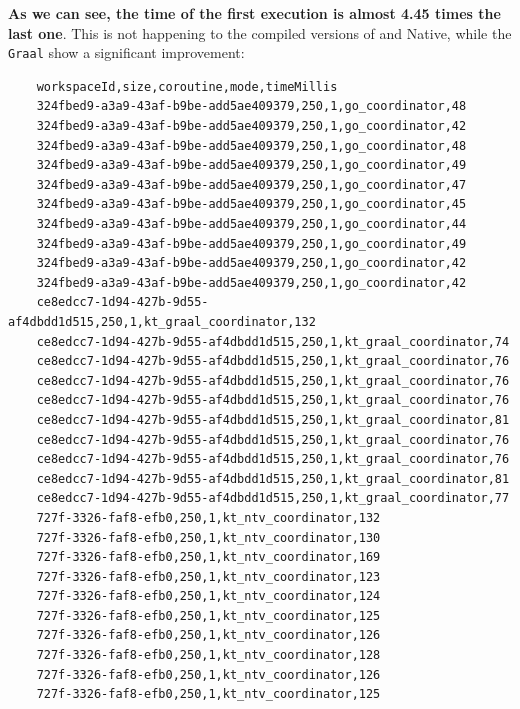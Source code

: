 \textbf{As we can see, the time of the first execution is almost 4.45 times the last one}. This is not happening to the compiled versions of \Go and \Kotlin Native, while the \texttt{Graal} show a significant improvement:

\begin{lstlisting}
	workspaceId,size,coroutine,mode,timeMillis
	324fbed9-a3a9-43af-b9be-add5ae409379,250,1,go_coordinator,48
	324fbed9-a3a9-43af-b9be-add5ae409379,250,1,go_coordinator,42
	324fbed9-a3a9-43af-b9be-add5ae409379,250,1,go_coordinator,48
	324fbed9-a3a9-43af-b9be-add5ae409379,250,1,go_coordinator,49
	324fbed9-a3a9-43af-b9be-add5ae409379,250,1,go_coordinator,47
	324fbed9-a3a9-43af-b9be-add5ae409379,250,1,go_coordinator,45
	324fbed9-a3a9-43af-b9be-add5ae409379,250,1,go_coordinator,44
	324fbed9-a3a9-43af-b9be-add5ae409379,250,1,go_coordinator,49
	324fbed9-a3a9-43af-b9be-add5ae409379,250,1,go_coordinator,42
	324fbed9-a3a9-43af-b9be-add5ae409379,250,1,go_coordinator,42
	ce8edcc7-1d94-427b-9d55-af4dbdd1d515,250,1,kt_graal_coordinator,132
	ce8edcc7-1d94-427b-9d55-af4dbdd1d515,250,1,kt_graal_coordinator,74
	ce8edcc7-1d94-427b-9d55-af4dbdd1d515,250,1,kt_graal_coordinator,76
	ce8edcc7-1d94-427b-9d55-af4dbdd1d515,250,1,kt_graal_coordinator,76
	ce8edcc7-1d94-427b-9d55-af4dbdd1d515,250,1,kt_graal_coordinator,76
	ce8edcc7-1d94-427b-9d55-af4dbdd1d515,250,1,kt_graal_coordinator,81
	ce8edcc7-1d94-427b-9d55-af4dbdd1d515,250,1,kt_graal_coordinator,76
	ce8edcc7-1d94-427b-9d55-af4dbdd1d515,250,1,kt_graal_coordinator,76
	ce8edcc7-1d94-427b-9d55-af4dbdd1d515,250,1,kt_graal_coordinator,81
	ce8edcc7-1d94-427b-9d55-af4dbdd1d515,250,1,kt_graal_coordinator,77
	727f-3326-faf8-efb0,250,1,kt_ntv_coordinator,132
	727f-3326-faf8-efb0,250,1,kt_ntv_coordinator,130
	727f-3326-faf8-efb0,250,1,kt_ntv_coordinator,169
	727f-3326-faf8-efb0,250,1,kt_ntv_coordinator,123
	727f-3326-faf8-efb0,250,1,kt_ntv_coordinator,124
	727f-3326-faf8-efb0,250,1,kt_ntv_coordinator,125
	727f-3326-faf8-efb0,250,1,kt_ntv_coordinator,126
	727f-3326-faf8-efb0,250,1,kt_ntv_coordinator,128
	727f-3326-faf8-efb0,250,1,kt_ntv_coordinator,126
	727f-3326-faf8-efb0,250,1,kt_ntv_coordinator,125
\end{lstlisting}

